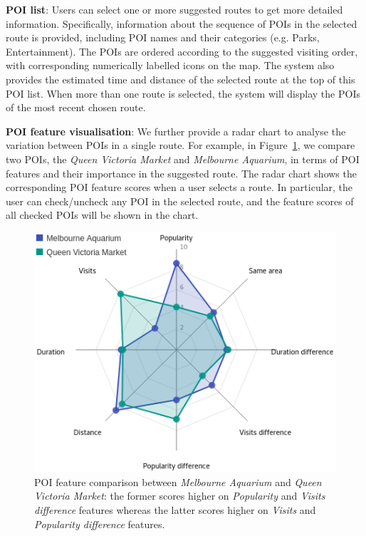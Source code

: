\textbf{POI list}:
Users can select one or more suggested routes to get more detailed information. 
Specifically, information about the sequence of POIs in the selected route is provided, including POI names and their categories (e.g. Parks, Entertainment).
The POIs are ordered according to the suggested visiting order, with corresponding numerically labelled icons on the map.
The system also provides the estimated time and distance of the selected route at the top of this POI list.
When more than one route is selected, the system will display the POIs of the most recent chosen route.

\textbf{POI feature visualisation}: We further provide a radar chart to analyse the variation between POIs in a single route. 
For example, in Figure~\ref{fig:radar}, we compare two POIs, the \textit{Queen Victoria Market} and \textit{Melbourne Aquarium}, in terms of POI features and their importance in the suggested route. 
The radar chart shows the corresponding POI feature scores when a user selects a route.
In particular, the user can check/uncheck any POI in the selected route, and the feature scores of all checked POIs will be shown in the chart.

\begin{figure}[t!]
\includegraphics[width=0.6\linewidth]{figure/sample_radar.png} \vspace{-10pt}
    \caption{POI feature comparison between \textit{Melbourne Aquarium} and \textit{Queen Victoria Market}: the former scores higher on \textit{Popularity} and \textit{Visits difference} features whereas the latter scores higher on \textit{Visits} and \textit{Popularity difference} features.}
\label{fig:radar} \vspace{-1em}
\end{figure}
